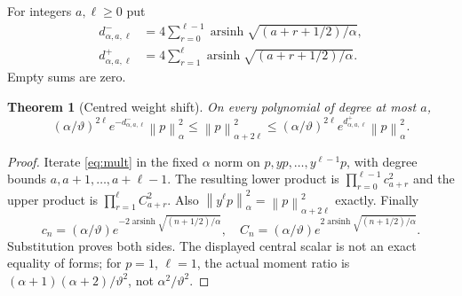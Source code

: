 \documentclass[11pt,a4paper]{article}
\newtheorem{theorem}{Theorem}[section]
\DeclareMathOperator{\arsinh}{arsinh}
\newcommand{\norm}[1]{\left\lVert#1\right\rVert}
\begin{document}
For integers $a,\ell\ge0$ put
\begin{equation}
\begin{split}
 d^-_{\alpha,a,\ell}
 &=4\sum_{r=0}^{\ell-1}\arsinh\sqrt{(a+r+1/2)/\alpha},\\
 d^+_{\alpha,a,\ell}
 &=4\sum_{r=1}^{\ell}\arsinh\sqrt{(a+r+1/2)/\alpha}.
\end{split}\label{eq:ds}
\end{equation}
Empty sums are zero.
\begin{theorem}[Centred weight shift]\label{thm:weights}
On every polynomial of degree at most $a$,
\begin{equation}
 (\alpha/\vartheta)^{2\ell}e^{-d^-_{\alpha,a,\ell}}\norm p_\alpha^2
 \le\norm p_{\alpha+2\ell}^2
 \le(\alpha/\vartheta)^{2\ell}e^{d^+_{\alpha,a,\ell}}\norm p_\alpha^2.
 \label{eq:weightshift}
\end{equation}
\end{theorem}
\begin{proof}
Iterate \eqref{eq:mult} in the fixed $\alpha$ norm on $p,yp,\ldots,y^{\ell-1}p$, with degree bounds $a,a+1,\ldots,a+\ell-1$. The resulting lower product is $\prod_{r=0}^{\ell-1}c_{a+r}^2$ and the upper product is $\prod_{r=1}^{\ell}C_{a+r}^2$. Also $\norm{y^\ell p}_\alpha^2=\norm p_{\alpha+2\ell}^2$ exactly. Finally
\[
 c_n=(\alpha/\vartheta)e^{-2\arsinh\sqrt{(n+1/2)/\alpha}},\quad
 C_n=(\alpha/\vartheta)e^{2\arsinh\sqrt{(n+1/2)/\alpha}}.
\]
Substitution proves both sides. The displayed central scalar is not an exact equality of forms; for $p=1$, $\ell=1$, the actual moment ratio is $(\alpha+1)(\alpha+2)/\vartheta^2$, not $\alpha^2/\vartheta^2$.
\end{proof}
\end{document}
